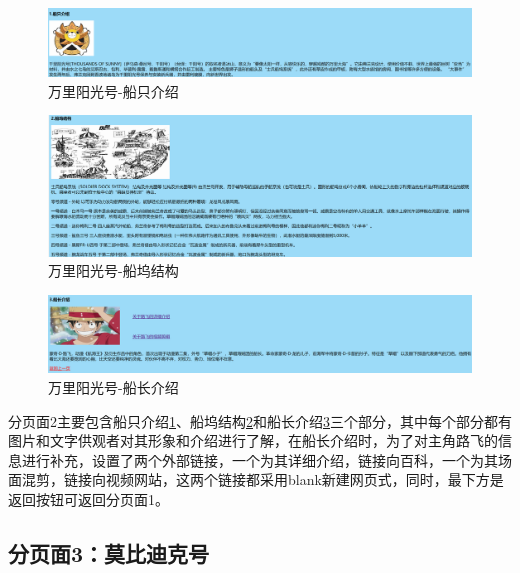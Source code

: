 \documentclass[supercite]{Experimental_Report}
\theoremstyle{definition}
\begin{document}
\begin{figure}[htp]
	\begin{center}
		\includegraphics[scale=0.40]{images/fen2.2.png}
		\caption{万里阳光号-船只介绍}
		\label{fig3-2}
	\end{center}
\end{figure}
\newpage
\begin{figure}[htp]
	\begin{center}
		\includegraphics[scale=0.4]{images/fen2.3.png}
		\caption{万里阳光号-船坞结构}
		\label{fig3-3}
	\end{center}
\end{figure}
\begin{figure}[htp]
	\begin{center}
		\includegraphics[scale=0.40]{images/fen2.1.png}
		\caption{万里阳光号-船长介绍}
		\label{fig3-4}
	\end{center}
\end{figure}
分页面2主要包含船只介绍\textcolor{blue}{\ref{fig3-2}}、船坞结构\textcolor{blue}{\ref{fig3-3}}和船长介绍\textcolor{blue}{\ref{fig3-4}}三个部分，其中每个部分都有图片和文字供观者对其形象和介绍进行了解，在船长介绍时，为了对主角路飞的信息进行补充，设置了两个外部链接，一个为其详细介绍，链接向百科，一个为其场面混剪，链接向视频网站，这两个链接都采用blank新建网页式，同时，最下方是返回按钮可返回分页面1。
\newpage
\subsection{分页面3：莫比迪克号}
\end{document}
